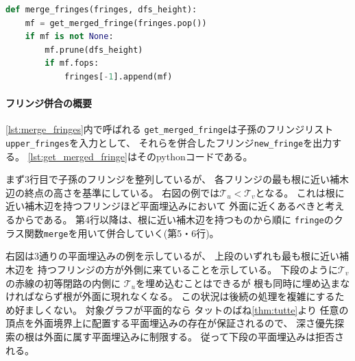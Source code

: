 \begin{lstlisting}[language=Python, caption=merge\_fringes,escapechar=@,
                   label=lst:merge_fringes]
def merge_fringes(fringes, dfs_height):
    mf = get_merged_fringe(fringes.pop())
    if mf is not None:
        mf.prune(dfs_height)
        if mf.fops:
            fringes[-1].append(mf)
\end{lstlisting}






\begin{paracol}{2}
\paragraph{フリンジ併合の概要}
\lstrefname\ref{lst:merge_fringes}内で呼ばれる
{\tt get\_merged\_fringe}は子孫のフリンジリスト
{\tt upper\_fringes}を入力として、
それらを併合したフリンジ{\tt new\_fringe}を出力する。
\lstrefname\ref{lst:get_merged_fringe}はそのpythonコードである。

まず3行目で子孫のフリンジを整列しているが、
各フリンジの最も根に近い補木辺の終点の高さを基準にしている。
右図の例では${\mathcal T}_u < {\mathcal T}_v$となる。
これは根に近い補木辺を持つフリンジほど平面埋込みにおいて
外面に近くあるべきと考えるからである。
第4行以降は、根に近い補木辺を持つものから順に
{\tt fringe}のクラス関数{\tt merge}を用いて併合していく(第5・6行)。

右図は3通りの平面埋込みの例を示しているが、
上段のいずれも最も根に近い補木辺を
持つフリンジの方が外側に来ていることを示している。
下段のように${\mathcal T}_v$の赤線の初等閉路の内側に
${\mathcal T}_u$を埋め込むことはできるが
根も同時に埋め込まなければならず根が外面に現れなくなる。
この状況は後続の処理を複雑にするため好ましくない。
対象グラフが平面的なら
タットのばね\cref{thm:tutte}より
任意の頂点を外面境界上に配置する平面埋込みの存在が保証されるので、
深さ優先探索の根は外面に属す平面埋込みに制限する。
従って下段の平面埋込みは拒否される。




\end{paracol}
